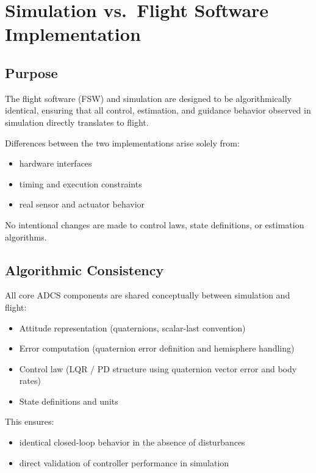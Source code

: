 \chapter{Simulation vs.\ Flight Software Implementation}

\section{Purpose}

The flight software (FSW) and simulation are designed to be algorithmically identical, ensuring that all control, estimation, and guidance behavior observed in simulation directly translates to flight.

Differences between the two implementations arise solely from:
\begin{itemize}
	\item hardware interfaces
	\item timing and execution constraints
	\item real sensor and actuator behavior
\end{itemize}

No intentional changes are made to control laws, state definitions, or estimation algorithms.

\section{Algorithmic Consistency}

All core ADCS components are shared conceptually between simulation and flight:
\begin{itemize}
	\item Attitude representation (quaternions, scalar-last convention)
	\item Error computation (quaternion error definition and hemisphere handling)
	\item Control law (LQR / PD structure using quaternion vector error and body rates)
	\item State definitions and units
\end{itemize}

This ensures:
\begin{itemize}
	\item identical closed-loop behavior in the absence of disturbances
	\item direct validation of controller performance in simulation
\end{itemize}

